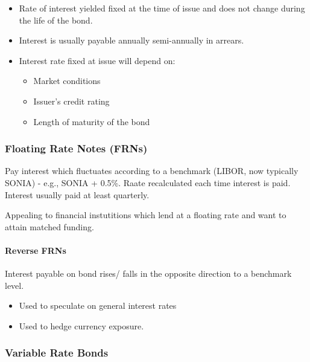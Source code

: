 \documentclass[
]{article}
\providecommand{\tightlist}{%
  \setlength{\itemsep}{0pt}\setlength{\parskip}{0pt}}
\begin{document}
\begin{itemize}
\tightlist
\item
  Rate of interest yielded fixed at the time of issue and does not
  change during the life of the bond.
\item
  Interest is usually payable annually semi-annually in arrears.
\item
  Interest rate fixed at issue will depend on:

  \begin{itemize}
  \tightlist
  \item
    Market conditions
  \item
    Issuer's credit rating
  \item
    Length of maturity of the bond
  \end{itemize}
\end{itemize}

\hypertarget{floating-rate-notes-frns}{%
\subsubsection{Floating Rate Notes
(FRNs)}\label{floating-rate-notes-frns}}

Pay interest which fluctuates according to a benchmark (LIBOR, now
typically SONIA) - e.g., SONIA + 0.5\%. Raate recalculated each time
interest is paid. Interest usually paid at least quarterly.

Appealing to financial instutitions which lend at a floating rate and
want to attain matched funding.

\hypertarget{reverse-frns}{%
\paragraph{Reverse FRNs}\label{reverse-frns}}

Interest payable on bond rises/ falls in the opposite direction to a
benchmark level.

\begin{itemize}
\tightlist
\item
  Used to speculate on general interest rates
\item
  Used to hedge currency exposure.
\end{itemize}

\hypertarget{variable-rate-bonds}{%
\subsubsection{Variable Rate Bonds}\label{variable-rate-bonds}}
\end{document}
